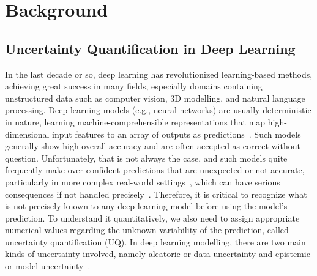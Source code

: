 \chapter{Background}\label{ch:background}



\section{Uncertainty Quantification in Deep Learning}\label{back_uqdl}
In the last decade or so, deep learning has revolutionized learning-based methods, achieving great success in many fields, especially domains containing unstructured data such as computer vision, 3D modelling, and natural language processing. Deep learning models (e.g., neural networks) are usually deterministic in nature, learning machine-comprehensible representations that map high-dimensional input features to an array of outputs as predictions~\cite{ReprLearn}. Such models generally show high overall accuracy and are often accepted as correct without question. Unfortunately, that is not always the case, and such models quite frequently make over-confident predictions that are unexpected or not accurate, particularly in more complex real-world settings~\cite{DLDifficult1, DLDifficult2}, which can have serious consequences if not handled precisely~\cite{DLDisaster1, DLDisaster2, DLDisaster3, DLDisaster4}. Therefore, it is critical to recognize what is not precisely known to any deep learning model before using the model's prediction. To understand it quantitatively, we also need to assign appropriate numerical values regarding the unknown variability of the prediction, called uncertainty quantification (UQ). In deep learning modelling, there are two main kinds of uncertainty involved, namely aleatoric or data uncertainty and epistemic or model uncertainty~\cite{UncertDeepL}.
\newline

